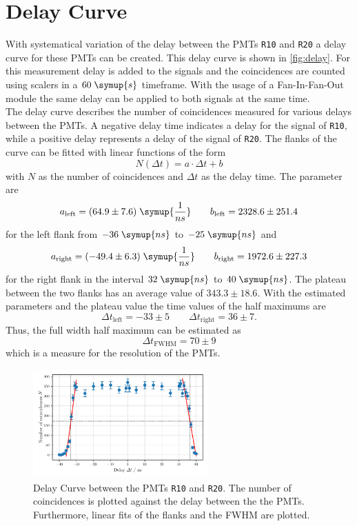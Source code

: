 \section{Delay Curve}
With systematical variation of the delay between the PMTs \texttt{R10} and \texttt{R20} a delay 
curve for these PMTs can be created. This delay curve is shown in \autoref{fig:delay}.
For this measurement delay is added to the signals and the coincidences are counted using scalers in 
a $60 \; \symup{s}$ timeframe. With the usage of a Fan-In-Fan-Out module the same delay 
can be applied to both signals at the same time. \\
The delay curve describes the number of coincidences measured for various delays between the PMTs.
A negative delay time indicates a delay for the signal of \texttt{R10}, while a positive delay 
represents a delay of the signal of \texttt{R20}. The flanks of the curve can be fitted with linear 
functions of the form 
\begin{equation*}
    N(\Delta t) = a \cdot \Delta t + b
\end{equation*}
with $N$ as the number of coincidences and $\Delta t$ as the delay time. 
The parameter are 
\begin{align*}
    a_{\text{left}} = (64.9 \pm 7.6)\; \symup{\frac{1}{ns}} \qquad
    b_{\text{left}} = 2328.6 \pm 251.4
\end{align*} 
for the left flank from $-36\;\symup{ns}$ to $-25\;\symup{ns}$ and    
\begin{align*}
    a_{\text{right}} = (-49.4 \pm 6.3)\; \symup{\frac{1}{ns}} \qquad
    b_{\text{right}} = 1972.6 \pm 227.3
\end{align*} 
for the right flank in the interval $32\;\symup{ns}$ to $40\;\symup{ns}$.
The plateau between the two flanks has an average value of $343.3 \pm 18.6$. With the estimated 
parameters and the plateau value the time values of the half maximums are 
\begin{equation*}
    \Delta t_{\text{left}} = -33 \pm 5 \qquad
    \Delta t_{\text{right}} = 36 \pm 7.
\end{equation*}
Thus, the full width half maximum can be estimated as 
\begin{equation*}
    \Delta t_{\text{FWHM}} = 70 \pm 9
\end{equation*}
which is a measure for the resolution of the PMTs.
\begin{figure}
    \centering
    \includegraphics[width=0.6\textwidth]{plots/delay.pdf}
    \caption{Delay Curve between the PMTs \texttt{R10} and \texttt{R20}. The number of coincidences is plotted against the delay between the the PMTs.
    Furthermore, linear fits of the flanks and the FWHM are plotted.}
    \label{fig:delay}
\end{figure}
